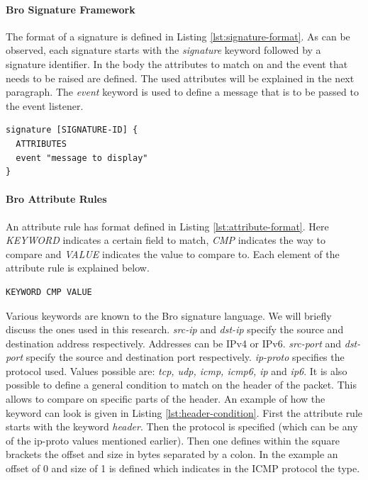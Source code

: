 \paragraph{Bro Signature Framework}
The format of a signature is defined in Listing \ref{lst:signature-format}. As can be observed, each signature starts with the \emph{signature} keyword followed by a signature identifier. In the body the attributes to match on and the event that needs to be raised are defined. The used attributes will be explained in the next paragraph. The \emph{event} keyword is used to define a message that is to be passed to the event listener.

\begin{lstlisting}[caption={Bro Signature Format}, label={lst:signature-format}]
signature [SIGNATURE-ID] {
  ATTRIBUTES  
  event "message to display"
}
\end{lstlisting}


\paragraph{Bro Attribute Rules}
An attribute rule has format defined in Listing \ref{lst:attribute-format}. Here \emph{KEYWORD} indicates a certain field to match, \emph{CMP} indicates the way to compare and \emph{VALUE} indicates the value to compare to. Each element of the attribute rule is explained below.

\begin{lstlisting}[caption={Bro Signature attribute rule format}, label={lst:attribute-format}]
KEYWORD CMP VALUE
\end{lstlisting}

Various keywords are known to the Bro signature language. We will briefly discuss the ones used in this research. \emph{src-ip} and \emph{dst-ip} specify the source and destination address respectively. Addresses can be IPv4 or IPv6. \emph{src-port} and \emph{dst-port} specify the source and destination port respectively. \emph{ip-proto} specifies the protocol used. Values possible are: \emph{tcp, udp, icmp, icmp6, ip} and \emph{ip6}. It is also possible to define a general condition to match on the header of the packet. This allows to compare on specific parts of the header. An example of how the keyword can look is given in Listing \ref{lst:header-condition}. First the attribute rule starts with the keyword \emph{header}. Then the protocol is specified (which can be any of the ip-proto values mentioned earlier). Then one defines within the square brackets the offset and size in bytes separated by a colon. In the example an offset of 0 and size of 1 is defined which indicates in the ICMP protocol the type. 

